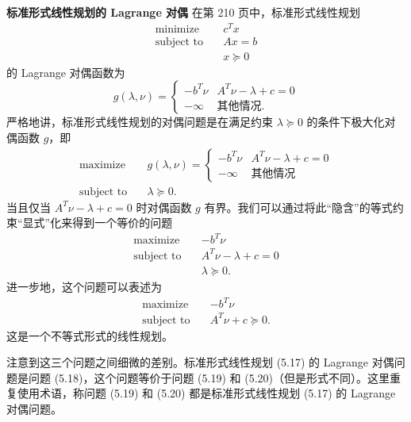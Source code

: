 \documentclass[UTF8, 12pt, fontset=fandol, oneside]{ctexart}
\begin{document}
\noindent\textbf{标准形式线性规划的 Lagrange 对偶}\quad
在第 210 页中，标准形式线性规划
\begin{equation}
\begin{aligned}
\text{minimize}\quad & c^Tx\\
\text{subject to}\quad & Ax=b\\
& x\succeq 0
\end{aligned}
\tag{5.17}
\end{equation}
的 Lagrange 对偶函数为
\[
g(\lambda,\nu)=
\begin{cases}
-b^T\nu & A^T\nu-\lambda+c=0\\
-\infty & \text{其他情况}.
\end{cases}
\]
严格地讲，标准形式线性规划的对偶问题是在满足约束 $\lambda\succeq 0$ 的条件下极大化对偶函数 $g$，即
\begin{equation}
\begin{aligned}
\text{maximize}\quad & g(\lambda,\nu)=
\begin{cases}
-b^T\nu & A^T\nu-\lambda+c=0\\
-\infty & \text{其他情况}
\end{cases}\\
\text{subject to}\quad & \lambda\succeq 0.
\end{aligned}
\tag{5.18}
\end{equation}
当且仅当 $A^T\nu-\lambda+c=0$ 时对偶函数 $g$ 有界。我们可以通过将此``隐含''的等式约束``显式''化来得到一个等价的问题
\begin{equation}
\begin{aligned}
\text{maximize}\quad & -b^T\nu\\
\text{subject to}\quad & A^T\nu-\lambda+c=0\\
& \lambda\succeq 0.
\end{aligned}
\tag{5.19}
\end{equation}
进一步地，这个问题可以表述为
\begin{equation}
\begin{aligned}
\text{maximize}\quad & -b^T\nu\\
\text{subject to}\quad & A^T\nu+c\succeq 0.
\end{aligned}
\tag{5.20}
\end{equation}
这是一个不等式形式的线性规划。

注意到这三个问题之间细微的差别。标准形式线性规划 (5.17) 的 Lagrange 对偶问题是问题 (5.18)，这个问题等价于问题 (5.19) 和 (5.20)（但是形式不同）。这里重复使用术语，称问题 (5.19) 和 (5.20) 都是标准形式线性规划 (5.17) 的 Lagrange 对偶问题。
\end{document}
